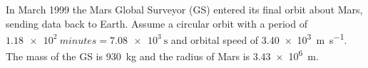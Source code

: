 \documentclass{../../../oss-apphys-exam}
\begin{document}
\begin{questions}


  \question In March 1999 the Mars Global Surveyor (GS) entered its final orbit
  about Mars, sending data back to Earth. Assume a circular orbit with a period
  of $\SI{1.18e2}{minutes}=\SI{7.08e3}{\second}$ and orbital speed of
  \SI{3.40e3}{\metre\per\second}. The mass of the GS is \SI{930}{\kilo\gram}
  and the radius of Mars is \SI{3.43e6}{\metre}.
\end{questions}
\end{document}
